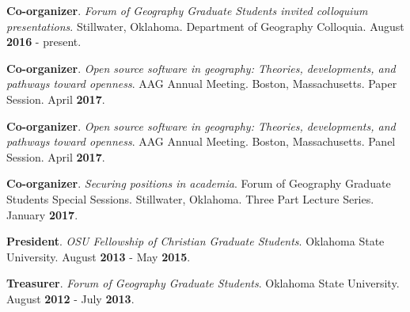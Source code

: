 \begin{cventries}
  \cventry
    {}
    {}
    {}
    {}
    {
       \begin{cvitems}
          \vspace{-3mm}
        \item {\textbf{Co-organizer}. \textit{Forum of Geography Graduate
              Students invited colloquium presentations}. Stillwater, Oklahoma.
            Department of Geography Colloquia. August \textbf{2016} - present.}
          \end{cvitems}
          }

  \cventry
    {}
    {}
    {}
    {}
    {
       \begin{cvitems}
          \vspace{-3mm}
        \item {\textbf{Co-organizer}. \textit{Open source software in geography:
              Theories, developments, and pathways toward openness}. AAG Annual
            Meeting. Boston, Massachusetts. Paper Session. April \textbf{2017}.}
          \end{cvitems}
          }

  \cventry
    {}
    {}
    {}
    {}
    {
       \begin{cvitems}
          \vspace{-3mm}
        \item {\textbf{Co-organizer}. \textit{Open source software in geography:
              Theories, developments, and pathways toward openness}. AAG Annual
            Meeting. Boston, Massachusetts. Panel Session. April \textbf{2017}.}
          \end{cvitems}
          }

  \cventry
    {}
    {}
    {}
    {}
    {
       \begin{cvitems}
          \vspace{-3mm}
        \item {\textbf{Co-organizer}. \textit{Securing positions in academia}.
            Forum of Geography Graduate Students Special Sessions. Stillwater,
            Oklahoma. Three Part Lecture Series. January \textbf{2017}.}
          \end{cvitems}
          }

  \cventry
    {}
    {}
    {}
    {}
    {
       \begin{cvitems}
          \vspace{-3mm}
        \item {\textbf{President}. \textit{OSU Fellowship of Christian Graduate
              Students}. Oklahoma State University. August \textbf{2013} -
            May \textbf{2015}.} 
          \end{cvitems}
          }

  \cventry
    {}
    {}
    {}
    {}
    {
       \begin{cvitems}
          \vspace{-3mm}
        \item {\textbf{Treasurer}. \textit{Forum of Geography Graduate
              Students}. Oklahoma State University. August \textbf{2012} - July
            \textbf{2013}. }
          \end{cvitems}
          }
\end{cventries}